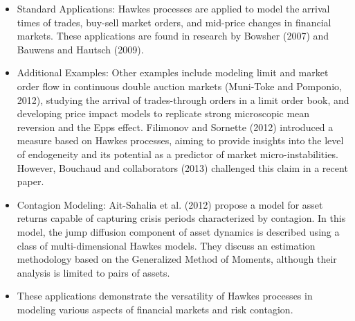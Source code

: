 \begin{itemize}
\item Standard Applications: Hawkes processes are applied to model the arrival times of trades, buy-sell market orders, and mid-price changes in financial markets. These applications are found in research by Bowsher (2007) and Bauwens and Hautsch (2009).

\item Additional Examples: Other examples include modeling limit and market order flow in continuous double auction markets (Muni-Toke and Pomponio, 2012), studying the arrival of trades-through orders in a limit order book, and developing price impact models to replicate strong microscopic mean reversion and the Epps effect. Filimonov and Sornette (2012) introduced a measure based on Hawkes processes, aiming to provide insights into the level of endogeneity and its potential as a predictor of market micro-instabilities. However, Bouchaud and collaborators (2013) challenged this claim in a recent paper.

\item Contagion Modeling: Ait-Sahalia et al. (2012) propose a model for asset returns capable of capturing crisis periods characterized by contagion. In this model, the jump diffusion component of asset dynamics is described using a class of multi-dimensional Hawkes models. They discuss an estimation methodology based on the Generalized Method of Moments, although their analysis is limited to pairs of assets.

\item These applications demonstrate the versatility of Hawkes processes in modeling various aspects of financial markets and risk contagion.
\end{itemize}